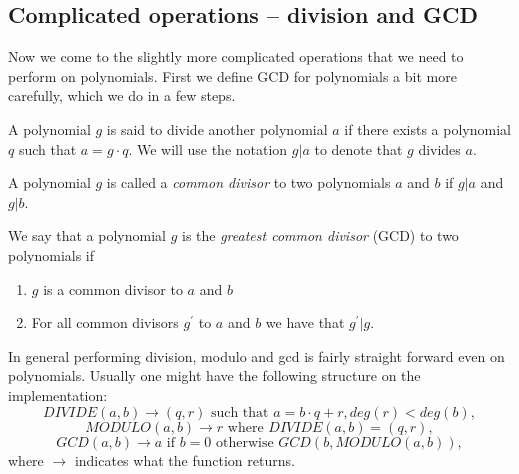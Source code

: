 \subsection{Complicated operations -- division and GCD}\label{Ch: div,mod,gcd}\label{Sub: diffop}
Now we come to the slightly more complicated operations that we need to perform on polynomials. First we define GCD for polynomials a bit more carefully, which we do in a few steps.
\begin{definition}\label{Def: divide}
  A polynomial $g$ is said to divide another polynomial $a$ if there exists a polynomial $q$ such that $a=g\cdot q$. We will use the notation $g|a$ to denote that $g$ divides $a$.
\end{definition}
\begin{definition}\label{Def: common divisor}
  A polynomial $g$ is called a \textit{common divisor} to two polynomials $a$ and $b$ if $g|a$ and $g|b$.
\end{definition}
\begin{definition}\label{Def: greatest common divisor}
  We say that a polynomial $g$ is the \textit{greatest common divisor} (GCD) to two polynomials if
  \begin{enumerate}
    \item $g$ is a common divisor to $a$ and $b$
    \item For all common divisors $g^\prime$ to $a$ and $b$ we have that $g^\prime|g$.
  \end{enumerate}
\end{definition}
In general performing division, modulo and gcd is fairly straight forward even on polynomials. Usually one might have the following structure on the implementation:
\begin{equation}\label{Eq: Theory,standard divide}
  DIVIDE(a,b) \rightarrow (q,r) \text{ such that } a=b\cdot q + r, deg(r) < deg(b),
\end{equation}
\begin{equation}
  MODULO(a,b) \rightarrow r \text{ where } DIVIDE(a,b) = (q,r),
\end{equation}
\begin{equation}\label{Eq: Theory,standard gcd}
  GCD(a,b) \rightarrow a \text{ if } b=0 \text{ otherwise } GCD(b,MODULO(a,b)),
\end{equation}
where $\rightarrow$ indicates what the function returns.

